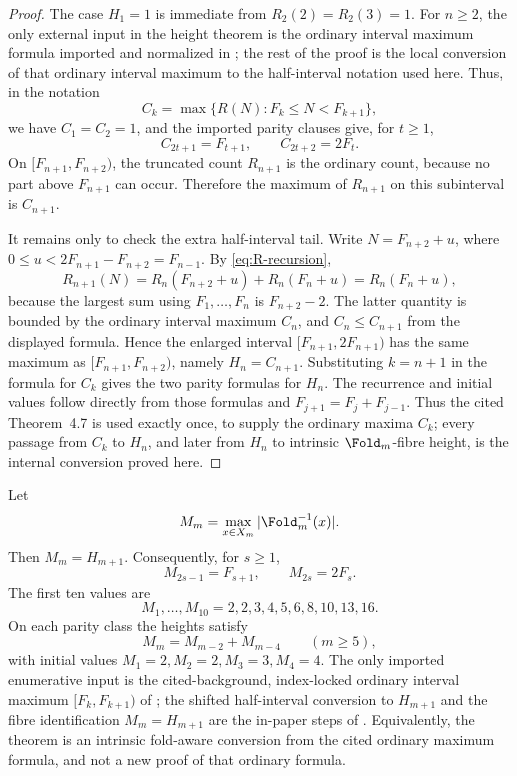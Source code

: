 \begin{proof}
The case \(H_1=1\) is immediate from \(R_2(2)=R_2(3)=1\).  For
\(n\ge2\), the only external input in the height theorem is the ordinary interval
maximum formula imported and normalized in
; the rest of the proof is
the local conversion of that ordinary interval maximum to the half-interval
notation used here.  Thus, in the notation
\[
  C_k=\max\{R(N):F_k\le N<F_{k+1}\},
\]
we have \(C_1=C_2=1\), and the imported parity clauses give, for \(t\ge1\),
\[
  C_{2t+1}=F_{t+1},\qquad C_{2t+2}=2F_t .
\]
On \([F_{n+1},F_{n+2})\), the truncated count \(R_{n+1}\) is the ordinary count,
because no part above \(F_{n+1}\) can occur.  Therefore the maximum of
\(R_{n+1}\) on this subinterval is \(C_{n+1}\).

It remains only to check the extra half-interval tail.  Write
\(N=F_{n+2}+u\), where
\(0\le u<2F_{n+1}-F_{n+2}=F_{n-1}\).  By \eqref{eq:R-recursion},
\[
  R_{n+1}(N)=R_n(F_{n+2}+u)+R_n(F_n+u)=R_n(F_n+u),
\]
because the largest sum using \(F_1,\ldots,F_n\) is \(F_{n+2}-2\).  The latter
quantity is bounded by the ordinary interval maximum \(C_n\), and
\(C_n\le C_{n+1}\) from the displayed formula.  Hence the enlarged interval
\([F_{n+1},2F_{n+1})\) has the same maximum as \([F_{n+1},F_{n+2})\), namely
\(H_n=C_{n+1}\).  Substituting \(k=n+1\) in the formula for \(C_k\) gives the two
parity formulas for \(H_n\).  The recurrence and initial values follow directly
from those formulas and \(F_{j+1}=F_j+F_{j-1}\).  Thus the cited Theorem~4.7 is
used exactly once, to supply the ordinary maxima \(C_k\); every passage from
\(C_k\) to \(H_n\), and later from \(H_n\) to intrinsic \(\Fold_m\)-fibre height,
is the internal conversion proved here.
\end{proof}

\begin{theorem}
\label{thm:intrinsic-fold-fibre-height}
Let
\[
  M_m=\max_{x\in X_m}|\Fold_m^{-1}(x)|.
\]
Then \(M_m=H_{m+1}\).  Consequently, for \(s\ge1\),
\[
  M_{2s-1}=F_{s+1},\qquad M_{2s}=2F_s .
\]
The first ten values are
\[
  M_1,\ldots,M_{10}=2,2,3,4,5,6,8,10,13,16.
\]
On each parity class the heights satisfy
\[
  M_m=M_{m-2}+M_{m-4}\qquad(m\ge5),
\]
with initial values \(M_1=2,M_2=2,M_3=3,M_4=4\).
The only imported enumerative input is the cited-background, index-locked
ordinary interval maximum \([F_k,F_{k+1})\) of
; the shifted
half-interval conversion to \(H_{m+1}\) and the fibre identification
\(M_m=H_{m+1}\) are the in-paper steps of
.
Equivalently, the theorem is an intrinsic fold-aware conversion from the cited
ordinary maximum formula, and not a new proof of that ordinary formula.
\end{theorem}

